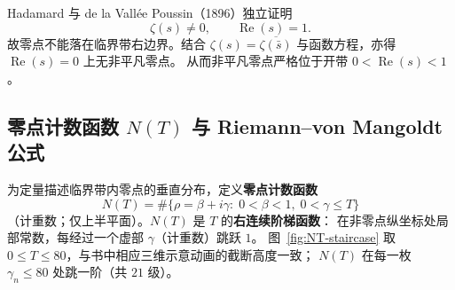 Hadamard 与 de la Vallée Poussin（1896）独立证明
\[
\boxed{
\zeta(s)\neq0,\qquad\operatorname{Re}(s)=1.
}
\]
故零点不能落在临界带右边界。结合 $\zeta(s)=\overline{\zeta(\bar s)}$ 与函数方程，亦得 $\operatorname{Re}(s)=0$ 上无非平凡零点。
从而非平凡零点严格位于开带 $0<\operatorname{Re}(s)<1$。

\subsection{零点计数函数 \texorpdfstring{$N(T)$}{N(T)} 与 Riemann--von Mangoldt 公式}
\label{sec:NT-RVM}

为定量描述临界带内零点的垂直分布，定义\textbf{零点计数函数}
\[
N(T)
=
\#\bigl\{\rho=\beta+i\gamma:\;
0<\beta<1,\;
0<\gamma\le T
\bigr\}
\]
（计重数；仅上半平面）。$N(T)$ 是 $T$ 的\textbf{右连续阶梯函数}：
在非零点纵坐标处局部常数，每经过一个虚部 $\gamma$（计重数）跳跃 $1$。
图~\ref{fig:NT-staircase} 取 $0\le T\le 80$，与书中相应三维示意动画的截断高度一致；
$N(T)$ 在每一枚 $\gamma_n\le 80$ 处跳一阶（共 $21$ 级）。

